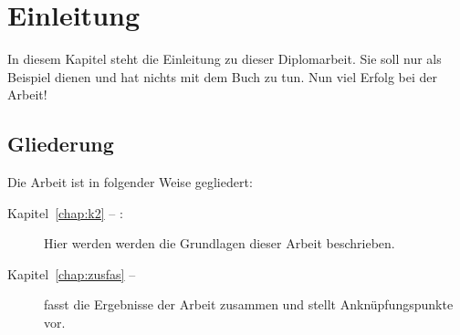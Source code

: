 
\chapter{Einleitung}
In diesem Kapitel steht die Einleitung zu dieser Diplomarbeit. Sie soll nur als Beispiel dienen und hat nichts mit dem Buch \cite{WSPA} zu tun. Nun viel Erfolg bei der Arbeit!

\section*{Gliederung}
Die Arbeit ist in folgender Weise gegliedert:
\begin{description}
\item[Kapitel~\ref{chap:k2} -- :] Hier werden werden die Grundlagen dieser Arbeit beschrieben.
\item[Kapitel~\ref{chap:zusfas} -- ] fasst die Ergebnisse der Arbeit zusammen und stellt Anknüpfungspunkte vor.
\end{description}
